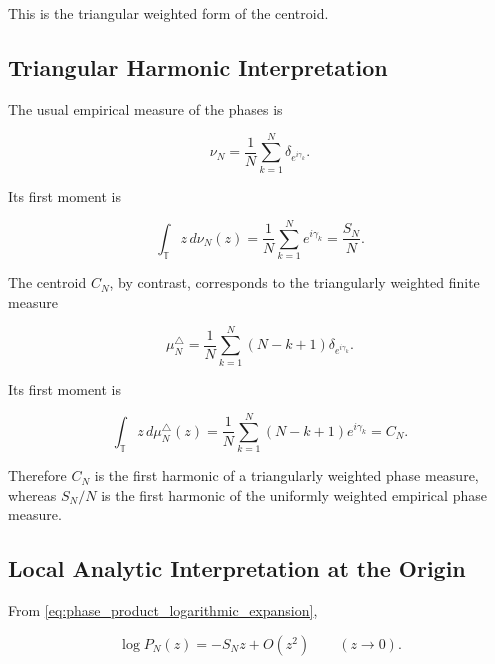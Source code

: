 \documentclass[11pt]{amsart}
\numberwithin{equation}{section}
\theoremstyle{plain}
\theoremstyle{definition}
\theoremstyle{remark}
\begin{document}
This is the triangular weighted form of the centroid.

\subsection{Triangular Harmonic Interpretation}
\label{subsec:triangular_harmonic_interpretation}

The usual empirical measure of the phases is

\begin{equation}
\nu_N
=
\frac{1}{N}
\sum_{k=1}^{N}
\delta_{e^{i\gamma_k}}.
\label{eq:uniform_empirical_phase_measure}
\end{equation}

Its first moment is

\begin{equation}
\int_{\mathbb T}
z\,d\nu_N(z)
=
\frac{1}{N}
\sum_{k=1}^{N}
e^{i\gamma_k}
=
\frac{S_N}{N}.
\label{eq:uniform_empirical_phase_first_moment}
\end{equation}

The centroid \(C_N\), by contrast, corresponds to the triangularly
weighted finite measure

\begin{equation}
\mu_N^{\triangle}
=
\frac{1}{N}
\sum_{k=1}^{N}
(N-k+1)
\delta_{e^{i\gamma_k}}.
\label{eq:triangular_phase_measure}
\end{equation}

Its first moment is

\begin{equation}
\int_{\mathbb T}
z\,d\mu_N^{\triangle}(z)
=
\frac{1}{N}
\sum_{k=1}^{N}
(N-k+1)e^{i\gamma_k}
=
C_N.
\label{eq:triangular_phase_measure_first_moment}
\end{equation}

Therefore \(C_N\) is the first harmonic of a triangularly weighted phase
measure, whereas \(S_N/N\) is the first harmonic of the uniformly
weighted empirical phase measure.

\subsection{Local Analytic Interpretation at the Origin}
\label{subsec:local_analytic_interpretation_origin}

From \eqref{eq:phase_product_logarithmic_expansion},

\begin{equation}
\log P_N(z)
=
-
S_N z
+
O(z^2)
\qquad
(z\to 0).
\label{eq:phase_product_local_expansion}
\end{equation}
\end{document}
